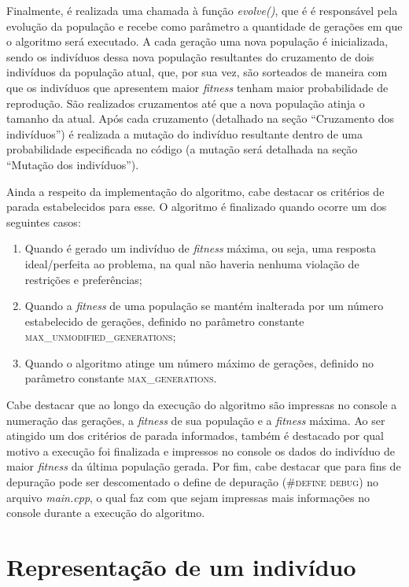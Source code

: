 \documentclass[12pt]{article}
\begin{document}
Finalmente, é realizada uma chamada à função \emph{evolve()}, que é é responsável pela evolução da população e recebe como parâmetro a quantidade de gerações em que o algoritmo será executado. A cada geração uma nova população é inicializada, sendo os indivíduos dessa nova população resultantes do cruzamento de dois indivíduos da população atual, que, por sua vez, são sorteados de maneira com que os indivíduos que apresentem maior \textit{fitness} tenham maior probabilidade de reprodução. São realizados cruzamentos até que a nova população atinja o tamanho da atual. Após cada cruzamento (detalhado na seção ``Cruzamento dos indivíduos'') é realizada a mutação do indivíduo resultante dentro de uma probabilidade especificada no código (a mutação será detalhada na seção ``Mutação dos indivíduos'').

Ainda a respeito da implementação do algoritmo, cabe destacar os critérios de parada estabelecidos para esse. O algoritmo é finalizado quando ocorre um dos seguintes casos:

\begin{enumerate}
    \item Quando é gerado um indivíduo de \textit{fitness} máxima, ou seja, uma resposta ideal/perfeita ao problema, na qual não haveria nenhuma violação de restrições e preferências;
    \item Quando a \textit{fitness} de uma população se mantém inalterada por um número estabelecido de gerações, definido no parâmetro constante \textsc{max\_unmodified\_generations};
    \item Quando o algoritmo atinge um número máximo de gerações, definido no parâmetro constante \textsc{max\_generations}.    
\end{enumerate}

Cabe destacar que ao longo da execução do algoritmo são impressas no console a numeração das gerações, a \textit{fitness} de sua população e a \textit{fitness} máxima. Ao ser atingido um dos critérios de parada informados, também é destacado por qual motivo a execução foi finalizada e impressos no console os dados do indivíduo de maior \textit{fitness} da última população gerada. Por fim, cabe destacar que para fins de depuração pode ser descomentado o define de depuração (\textsc{\#define debug}) no arquivo \textit{main.cpp}, o qual faz com que sejam impressas mais informações no console durante a execução do algoritmo.

\section{Representação de um indivíduo}
\end{document}
